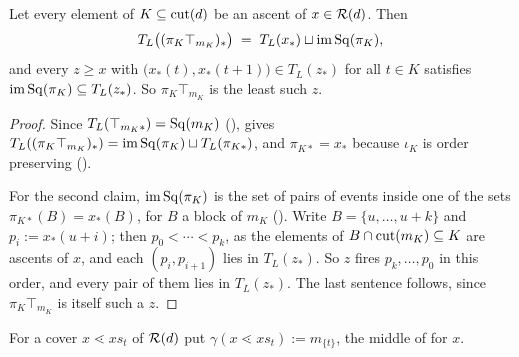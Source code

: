\documentclass[11pt]{article}
\begin{document}
\begin{lemma}\label{lem:closure}
  Let every element of $K \subseteq \operatorname{cut}(d)$ be an ascent of $x \in \mathcal{R}(d)$. Then
  \[
    T_L\bigl((\pi_K \top_{m_K})_*\bigr) \;=\; T_L(x_*) \sqcup \operatorname{im}\operatorname{Sq}(\pi_K),
  \]
  and every $z \ge x$ with $\bigl(x_*(t), x_*(t+1)\bigr) \in T_L(z_*)$ for all $t \in K$
  satisfies $\operatorname{im}\operatorname{Sq}(\pi_K) \subseteq T_L(z_*)$. So $\pi_K\top_{m_K}$ is the least such $z$.
\end{lemma}
\begin{proof}
  Since $T_L(\top_{m_K*}) = \operatorname{Sq}(m_K)$ (),  gives
  $T_L((\pi_K\top_{m_K})_*) = \operatorname{im}\operatorname{Sq}(\pi_K) \sqcup T_L(\pi_{K*})$, and $\pi_{K*} = x_*$ because
  $\iota_K$ is order preserving ().

  For the second claim, $\operatorname{im}\operatorname{Sq}(\pi_K)$ is the set of pairs of events inside one of the sets
  $\pi_{K*}(B) = x_*(B)$, for $B$ a block of $m_K$ (). Write $B = \{u, \dots, u+k\}$ and $p_i := x_*(u+i)$; then
  $p_0 < \cdots < p_k$, as the elements of $B \cap \operatorname{cut}(m_K) \subseteq K$ are ascents of $x$, and
  each $(p_i, p_{i+1})$ lies in $T_L(z_*)$. So $z$ fires $p_k, \dots, p_0$ in this order, and every
  pair of them lies in $T_L(z_*)$. The last sentence follows, since $\pi_K\top_{m_K}$ is itself
  such a $z$.
\end{proof}

For a cover $x \lessdot xs_t$ of $\mathcal{R}(d)$ put $\gamma(x \lessdot xs_t) := m_{\{t\}}$, the
middle of  for $x$.
\end{document}
